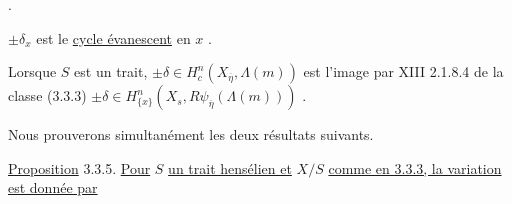 \begin{center}
\quad .
\end{center}
$\pm \delta_x$ est le \underline{cycle évanescent} en $x$ .

Lorsque $S$ est un trait, $\pm \delta \in H^n_c(X_{\overline{\eta}},\Lambda(m))$ est l'image par XIII 2.1.8.4 de la classe (3.3.3) $\pm \delta \in H^n_{\{x\}}(X_s,R\psi_{\overline{\eta}}(\Lambda(m)))$ .

Nous prouverons simultanément les deux résultats suivants.

\underline{Proposition} 3.3.5. \underline{Pour} $S$ \underline{un trait hensélien et} $X/S$ \underline{comme en 3.3.3, la variation est donnée par}


